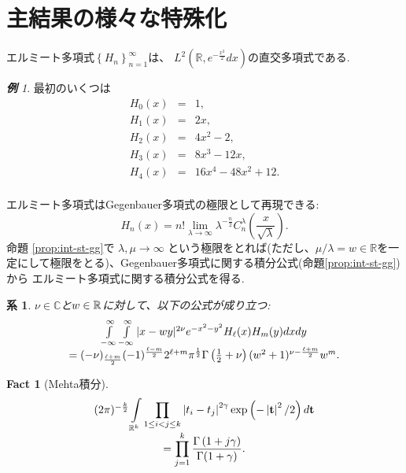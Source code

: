 \documentclass[12pt]{article} %
\newtheorem*{fact*}{Fact}
\newtheorem{cor}{系}
\theoremstyle{remark}
\newtheorem*{example*}{\textbf{例}}
\begin{document}
\section{主結果の様々な特殊化}
エルミート多項式$\left\{ H_n \right\}_{n=1}^\infty$は、
	$L^2\left( \mathbb{R},e^{-\frac{x^2}{2}}dx \right)$の直交多項式である.
	\begin{example*}
		最初のいくつは
	\vspace{-0.3cm}
		\begin{eqnarray*}
		H_0(x)&=& 1,\\
		H_1(x)&=& 2x,\\
		H_2(x)&=& 
		4x^2-2,\\
		H_3(x)&=& 8x^3-12x,\\
		H_4(x)&=& 16x^4-48x^2+12.\\
		\end{eqnarray*}
	\end{example*}
	エルミート多項式はGegenbauer多項式の極限として再現できる:
	\begin{equation*}
			H_n (x) = n! \lim_{\lambda \rightarrow \infty} \lambda^{- \frac{n}{2}}
			C_n^{\lambda} \left( \frac{x}{\sqrt{\lambda}} \right).
	\end{equation*}
	命題 \ref{prop:int-st-gg}で $\lambda,\mu\to\infty$ 
	という極限をとれば(ただし、$\mu/\lambda=w\in\mathbb{R}$を一定にして極限をとる)、Gegenbauer多項式に関する積分公式(命題\ref{prop:int-st-gg})から
	エルミート多項式に関する積分公式を得る.
	\begin{cor}\label{cor:int-xzy-hh}
		$\nu\in\mathbb{C}$と$w\in\mathbb{R}$に対して、以下の公式が成り立つ:
		\begin{equation*}
			\begin{array}[]{c}
			\int_{- \infty}^{\infty} \int_{- \infty}^{\infty} | x - w y |^{2 \nu} e^{-
			x^2 - y^2} H_\ell (x) H_m (y) d x d y \\= (- \nu)_{\frac{\ell + m}{2}} (- 1)^{\frac{\ell
			- m}{2}} 2^{\ell + m} \pi^{\frac{1}{2}} \Gamma \left( \frac{1}{2} + \nu \right)
			(w^2 + 1)^{\nu - \frac{\ell + m}{2}} w^m .
			\end{array}
		\end{equation*}
	\end{cor}
		\begin{fact*}[Mehta積分]
			{
		\begin{equation*}
			\begin{array}[]{c}
			{(2\pi)^{-\frac{k}{2}}}\displaystyle\int_{\mathbb{R}^k}\prod_{1\le i<j\le k}\myabs{t_i-t_j}^{2\gamma}\exp\left( -\myabs{\mathbf{t}}^2/2 \right)d\mathbf{t}\\
			=\displaystyle\prod_{j=1}^k\frac{\Gamma\left( 
			1+j\gamma\right)}{\Gamma(1+\gamma)}.
			\end{array}
		\end{equation*}
	}
		\end{fact*}
\end{document}
